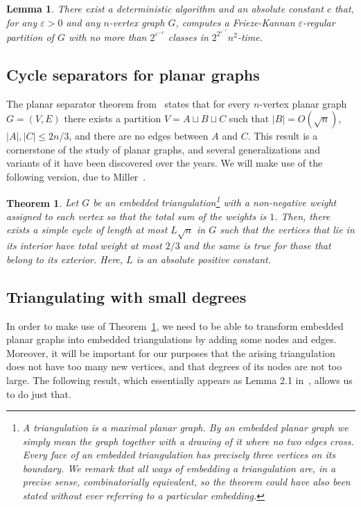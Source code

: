 \documentclass{article}
\newcounter{contSect} \numberwithin{contSect}{section}
\newtheorem{theorem}[contSect]{Theorem}
\newtheorem{lemma}[contSect]{Lemma}
\begin{document}
\begin{lemma}\label{teo:FriezeKannan}
    There exist a deterministic algorithm and an absolute constant $c$ that, for any $\varepsilon>0$ and any $n$-vertex graph $G$, computes a Frieze-Kannan $\varepsilon$-regular partition of $G$ with no more than $2^{\varepsilon^{-c}}$ classes in $2^{2^{\varepsilon^{-c}}} n^2$-time.
\end{lemma}

\subsection{Cycle separators for planar graphs}

The planar separator theorem from~\cite{ungar,liptontarjan} states that for every $n$-vertex planar graph $G=(V,E)$ there exists a partition $V=A\sqcup B\sqcup C$ such that $|B|=O(\sqrt{n})$, $|A|,|C|\leq 2n/3$, and there are no edges between $A$ and $C$. This result is a cornerstone of the study of planar graphs, and several generalizations and variants of it have been discovered over the years. We will make use of the following version, due to Miller~\cite{cycleseparator}.

\begin{theorem}\label{teo:cycleseparator}
    Let $G$ be an embedded triangulation\footnote{A \textit{triangulation} is a maximal planar graph. By an \textit{embedded} planar graph we simply mean the graph together with a drawing of it where no two edges cross. Every face of an embedded triangulation has precisely three vertices on its boundary. We remark that all ways of embedding a triangulation are, in a precise sense, combinatorially equivalent, so the theorem could have also been stated without ever referring to a particular embedding.} with a non-negative weight assigned to each vertex so that the total sum of the weights is $1$. Then, there exists a simple cycle of length at most $L\sqrt{n}$ in $G$ such that the vertices that lie in its interior have total weight at most $2/3$ and the same is true for those that belong to its exterior. Here, $L$ is an absolute positive constant.
\end{theorem}

\subsection{Triangulating with small degrees}\label{teo:triangulation}

In order to make use of Theorem~\ref{teo:cycleseparator}, we need to be able to transform embedded planar graphs into embedded triangulations by adding some nodes and edges. Moreover, it will be important for our purposes that the arising triangulation does not have too many new vertices, and that degrees of its nodes are not too large. The following result, which essentially appears as Lemma 2.1 in~\cite{pach2005crossing}, allows us to do just that.
\end{document}
